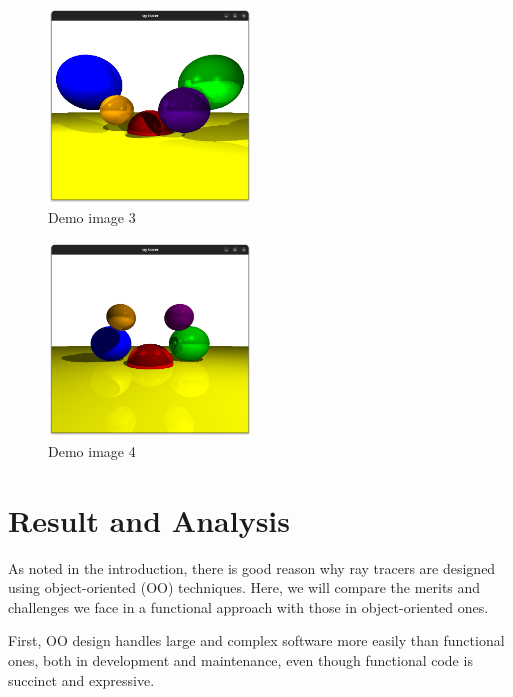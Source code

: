 \documentclass[conference]{IEEEtran}
\begin{document}
\begin{figure}[htbp]
  \centerline{\includegraphics[width=0.48\textwidth]{./figs/demo3.png}}
  \caption{Demo image 3}
  \label{demo3}
\end{figure}
\begin{figure}[htbp]
  \centerline{\includegraphics[width=0.48\textwidth]{./figs/demo4.png}}
  \caption{Demo image 4}
  \label{demo4}
\end{figure}

\section{Result and Analysis}

As noted in the introduction, there is good reason why ray tracers are designed using object-oriented (OO) techniques. Here, we will compare the merits and challenges we face in a functional approach with those in object-oriented ones.

First, OO design handles large and complex software more easily than functional ones, both in development and maintenance, even though functional code is succinct and expressive. 
\end{document}
